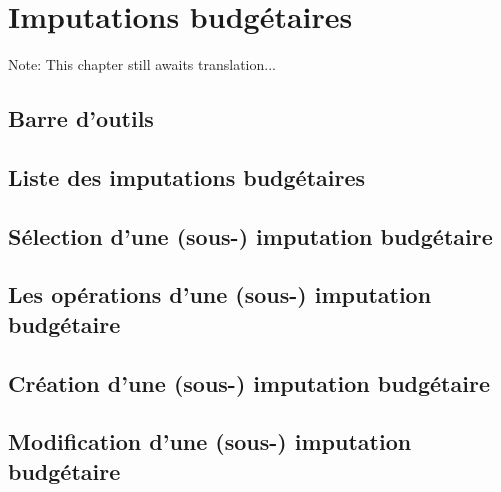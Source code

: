 
\chapter{Imputations budgétaires\label{budgetarylines}}

Note: This chapter still awaits translation...

\section{Barre d'outils\label{budgetarylines-functions}}


\section{Liste des imputations budgétaires\label{budgetarylines-list}}

\section{Sélection d'une (sous-) imputation budgétaire\label{budgetarylines-selection}}


\section{Les opérations d'une (sous-) imputation budgétaire\label{budgetarylines-transactions}}

\section{Création d'une (sous-) imputation budgétaire\label{budgetarylines-new}}


\section{Modification d'une (sous-) imputation budgétaire\label{budgetarylines-modify}}


